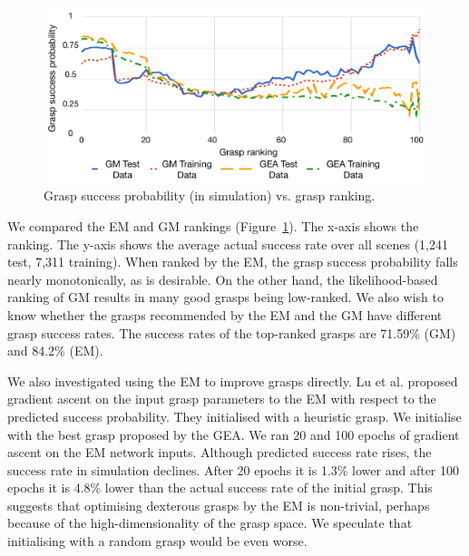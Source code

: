 \begin{figure}[t]
  \includegraphics[width=\linewidth]{images/successvsranking.pdf}
  \caption{Grasp success probability (in simulation) vs. grasp ranking.}
  \label{fig:successvsranking}
\end{figure}

We compared the EM and GM rankings (Figure~\ref{fig:successvsranking}). The x-axis shows the ranking. The y-axis shows the average actual success rate over all scenes (1,241 test, 7,311 training). When ranked by the EM, the grasp success probability falls nearly monotonically, as is desirable. On the other hand, the likelihood-based ranking of GM results in many good grasps being low-ranked. We also wish to know whether the grasps recommended by the EM and the GM have different grasp success rates. The success rates of the top-ranked grasps are 71.59\% (GM) and  84.2\% (EM).

We also investigated using the EM to improve grasps directly. Lu et al. \cite{lu2017planning} proposed gradient ascent on the input grasp parameters to the EM with respect to the predicted success probability. They initialised with a heuristic grasp. We initialise with the best grasp proposed by the GEA. We ran 20 and 100 epochs of gradient ascent on the EM network inputs. Although predicted success rate rises, the success rate in simulation declines. After 20 epochs it is 1.3\% lower and after 100 epochs it is 4.8\% lower than the actual success rate of the initial grasp. This suggests that optimising dexterous grasps by the EM is non-trivial, perhaps because of the high-dimensionality of the grasp space. We speculate that initialising with a random grasp would be even worse.

